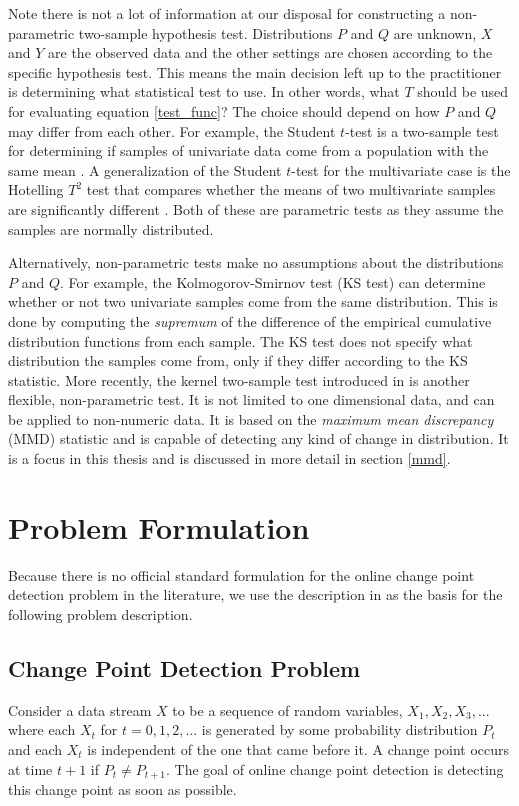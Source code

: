 Note there is not a lot of information at our disposal for constructing a non-parametric two-sample hypothesis test. Distributions $P$ and $Q$ are unknown, $X$ and $Y$ are the observed data and the other settings are chosen according to the specific hypothesis test.  This means the main decision left up to the practitioner is determining what statistical test to use. In other words, what $T$ should be used for evaluating equation \ref{test_func}? The choice should depend on how $P$ and $Q$ may differ from each other. For example, the Student $t$-test is a two-sample test for determining if samples of univariate data come from a population with the same mean \cite{student1908probable}. A generalization of the Student $t$-test for the multivariate case is the Hotelling $T^2$ test that compares whether the means of two multivariate samples are significantly different \cite{hotelling1992generalization}. Both of these are parametric tests as they assume the samples are normally distributed. 

Alternatively, non-parametric tests make no assumptions about the distributions $P$ and $Q$. For example, the Kolmogorov-Smirnov test (KS test) \cite{massey1951kolmogorov} can determine whether or not two univariate samples come from the same distribution. This is done by computing the \textit{supremum} of the difference of the empirical cumulative distribution functions from each sample. The KS test does not specify what distribution the samples come from, only if they differ according to the KS statistic. More recently, the kernel two-sample test introduced in \cite{gretton2012kernel} is another flexible, non-parametric test. It is not limited to one dimensional data, and can be applied to non-numeric data. It is based on the \textit{maximum mean discrepancy} (MMD) statistic and is capable of detecting any kind of change in distribution. It is a focus in this thesis and is discussed in more detail in section \ref{mmd}.

\section{Problem Formulation}
Because there is no official standard formulation for the online change point detection problem in the literature, we use the description in \cite{kifer2004detecting} as the basis for the following problem description. 

\subsection{Change Point Detection Problem}
\label{probFormulation}
Consider a data stream $X$ to be a sequence of random variables, $X_1, X_2, X_3,...$ where each $X_t$ for $t=0,1,2,...$ is generated by some probability distribution $P_t$ and each $X_t$ is independent of the one that came before it. A change point occurs at time $t+1$ if $P_t \neq P_{t+1}$. The goal of online change point detection is detecting this change point as soon as possible. 

